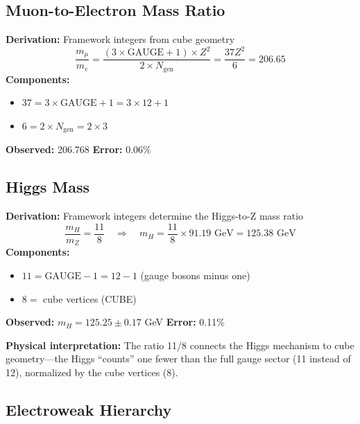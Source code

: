 \documentclass[12pt,a4paper]{article}
\newcommand{\Zsq}{Z^2}
\newcommand{\GAUGE}{\text{GAUGE}}
\newcommand{\Ngen}{N_{\text{gen}}}
\begin{document}
\subsection{Muon-to-Electron Mass Ratio}

\begin{derivedbox}
\textbf{Derivation:} Framework integers from cube geometry
\begin{equation}
\frac{m_\mu}{m_e} = \frac{(3 \times \GAUGE + 1) \times \Zsq}{2 \times \Ngen} = \frac{37 \Zsq}{6} = 206.65
\end{equation}
\textbf{Components:}
\begin{itemize}
    \item $37 = 3 \times \GAUGE + 1 = 3 \times 12 + 1$
    \item $6 = 2 \times \Ngen = 2 \times 3$
\end{itemize}
\textbf{Observed:} 206.768 \quad \textbf{Error:} 0.06\%
\end{derivedbox}

\subsection{Higgs Mass}

\begin{derivedbox}
\textbf{Derivation:} Framework integers determine the Higgs-to-Z mass ratio
\begin{equation}
\frac{m_H}{m_Z} = \frac{11}{8} \quad \Rightarrow \quad m_H = \frac{11}{8} \times 91.19 \text{ GeV} = 125.38 \text{ GeV}
\end{equation}
\textbf{Components:}
\begin{itemize}
    \item $11 = \GAUGE - 1 = 12 - 1$ (gauge bosons minus one)
    \item $8 = $ cube vertices (CUBE)
\end{itemize}
\textbf{Observed:} $m_H = 125.25 \pm 0.17$ GeV \quad \textbf{Error:} 0.11\%
\end{derivedbox}

\textbf{Physical interpretation:} The ratio 11/8 connects the Higgs mechanism to cube geometry---the Higgs ``counts'' one fewer than the full gauge sector (11 instead of 12), normalized by the cube vertices (8).

\subsection{Electroweak Hierarchy}
\end{document}
